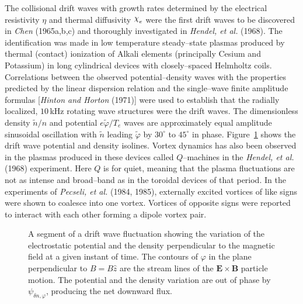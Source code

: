 \documentclass[a4paper,openany,12pt]{book}
\def\chix{\raise.5ex\hbox{$\chi$}}
\begin{document}
The collisional drift waves with growth rates determined by the electrical resistivity $\eta$ and thermal diffusivity $\chix_e$ were the first drift waves to be discovered in \emph{Chen} (1965a,b,c) and thoroughly investigated in \emph{Hendel, et al.} (1968). The identification was made in low temperature steady--state plasmas produced by thermal (contact) ionization of Alkali elements (principally Cesium and Potassium) in long cylindrical devices with closely--spaced Helmholtz coils. Correlations between the observed potential--density waves with the properties predicted by the linear dispersion relation and the single--wave finite amplitude formulas [\emph{Hinton and Horton} (1971)] were used to establish that the radially localized, $10\,$kHz rotating wave structures were the drift waves. The dimensionless density $\widetilde n/n$ and potential $e\widetilde\varphi/T_e$ waves are approximately equal amplitude sinusoidal oscillation with $\widetilde n$ leading $\widetilde\varphi$ by $30^\circ$ to $45^\circ$ in phase. Figure~\ref{F9.4} shows the drift wave potential and density isolines. Vortex dynamics has also been observed in the plasmas produced in these devices called $Q$--machines in the \emph{Hendel, et al.} (1968) experiment. Here $Q$ is for quiet, meaning that the plasma fluctuations are not as intense and broad--band as in the toroidal devices of that period. In the experiments of \emph{Pecseli, et al.} (1984, 1985), externally excited vortices of like signs were shown to coalesce into one vortex. Vortices of opposite signs were reported to interact with each other forming a dipole vortex pair.
%
\begin{figure}[H]
\centerline{}
\caption{A segment of a drift wave fluctuation showing the variation of the electrostatic potential and the density perpendicular to the magnetic field at a given instant of time. The contours of $\varphi$ in the plane perpendicular to $B=B\widehat z$ are the stream lines of the $\bm{E\times B}$ particle motion. The potential and the density variation are out of phase by $\psi_{\delta n,\varphi}$, producing the net downward flux.}
\label{F9.4}
\end{figure}
%
\end{document}
